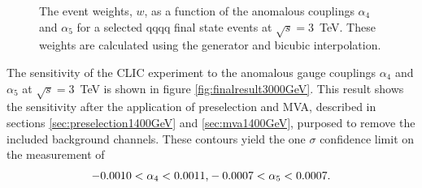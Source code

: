 \begin{figure}[h!]
\centering
{}
\caption[The event weights, $w$, as a function of the anomalous couplings $\alpha_{4}$ and $\alpha_{5}$ for a selected \nu{\nu}qqqq final state events at $\sqrt{s}=3$~TeV.  These weights are calculated using \protect{} the generator and \protect{} bicubic interpolation.]{The event weights, $w$, as a function of the anomalous couplings $\alpha_{4}$ and $\alpha_{5}$ for a selected \nu{\nu}qqqq final state events at $\sqrt{s}=3$~TeV.  These weights are calculated using \protect{} the generator and \protect{} bicubic interpolation.}
\label{fig:eventweights3000}
\end{figure}

The sensitivity of the CLIC experiment to the anomalous gauge couplings $\alpha_{4}$ and $\alpha_{5}$ at $\sqrt{s}=3$~TeV is shown in figure \ref{fig:finalresult3000GeV}.  This result shows the sensitivity after the application of preselection and MVA, described in sections \ref{sec:preselection1400GeV} and \ref{sec:mva1400GeV}, purposed to remove the included background channels.  These contours yield the one $\sigma$ confidence limit on the measurement of 
%
\begin{equation}
-0.0010 < \alpha_{4} < 0.0011 \text{,} \\
-0.0007 < \alpha_{5} < 0.0007 \text{.}
\end{equation}
%

